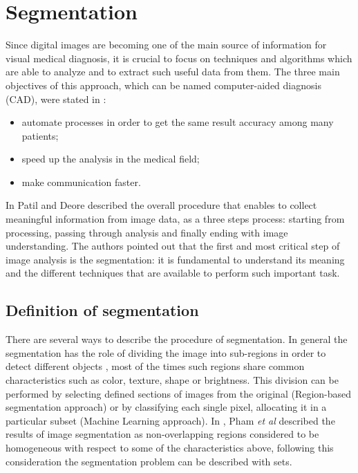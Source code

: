 \documentclass[../main.tex]{subfiles}
\begin{document}
\section{Segmentation}

Since digital images are becoming one of the main source of information for visual medical diagnosis, it is crucial to focus on techniques and algorithms which are able to analyze and to extract such useful data from them.
The three main objectives of this approach, which can be named computer-aided diagnosis (CAD), were stated in \cite{automated_segm_tech}:
\begin{itemize}
    \item automate processes in order to get the same result accuracy among many patients;
    \item speed up the analysis in the medical field;
    \item make communication faster.
\end{itemize}
In \cite{segmentation_review_1} Patil and Deore  described the overall procedure that enables to collect meaningful information from image data, as a three steps process: starting from processing, passing through analysis and finally ending with image understanding. The authors pointed out that the first and most critical step of image analysis is the segmentation: it is fundamental to understand its meaning and the different techniques that are available to perform such important task.

\subsection{Definition of segmentation}

There are several ways to describe the procedure of segmentation.
In general the segmentation has the role of dividing the image into sub-regions in order to detect different objects \cite{automated_segm_tech}, most of the times such regions share common characteristics such as color, texture, shape or brightness.
This division can be performed by selecting  defined sections of images from the original (Region-based segmentation approach) or by classifying each single pixel, allocating it in a particular subset (Machine Learning approach).
In \cite{sgmentation_1_survey}, Pham \textit{et al} described the results of image segmentation as non-overlapping regions considered to be homogeneous with respect to some of the characteristics above, following this consideration the segmentation problem can be described with sets.
\end{document}
